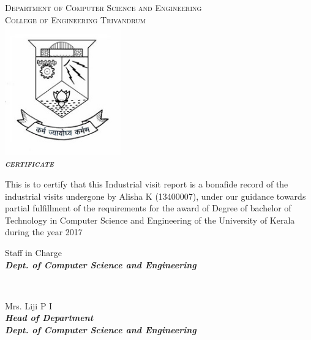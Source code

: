 \documentclass[a4paper,12pt]{report}
\begin{document}
	\begin{titlepage}
		\begin{centering}
			\textsc{\large{Department of Computer Science and Engineering}}\\
			\textsc{\large{College of Engineering Trivandrum}}\\[0.5cm]

			\includegraphics[width=5cm]{images/logo.jpg}\\[0.5cm]
			\textbf{\textit{\LARGE\textsc{{certificate}}}}\\[0.3cm]

		\end{centering}

		\begin{sloppypar}
		\large{This is to certify that this Industrial visit report is a bonafide record of the industrial visits undergone by Alisha K (13400007), under our guidance towards partial fulfillment of the requirements for the award of Degree of bachelor of Technology in Computer Science and Engineering of the University of Kerala during the year 2017}\\[1.5cm]
		\end{sloppypar}

		\begin{minipage}{0.4\textwidth}
		\begin{flushleft}
		\begin{centering} \large
		\large{Staff in Charge}\\
		\small{\textit{\textbf{Dept. of Computer Science and Engineering}}}\\[1.5cm]

		\end{centering}
		
		\end{flushleft}
		\end{minipage}
		~
		\begin{minipage}{0.5\textwidth}
		\begin{centering} \large
			\large{Mrs. Liji P I}\\
			\small{\textit{\textbf{Head of Department}}}\\
			\small{\textit{\textbf{Dept. of Computer Science and Engineering}}}\\
		\end{centering}
		\end{minipage}\\[1.0cm]


\end{titlepage}
\end{document}
